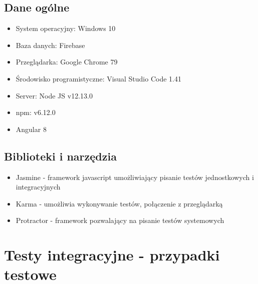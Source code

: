 \documentclass[a4paper,15pt]{article}
\begin{document}
\subsection{Dane ogólne}
\begin{itemize}
\item System operacyjny: Windows 10
\item Baza danych: Firebase
\item Przeglądarka: Google Chrome 79
\item Środowisko programistyczne: Visual Studio Code 1.41
\item Server: Node JS v12.13.0
\item npm: v6.12.0
\item Angular 8
\end{itemize}

\subsection{Biblioteki i narzędzia}
\begin{itemize}
\item Jasmine - framework javascript umożliwiający pisanie testów jednostkowych i integracyjnych
\item Karma - umożliwia wykonywanie testów, połączenie z przeglądarką
\item Protractor - framework pozwalający na pisanie testów systemowych
\end{itemize}

\newpage
\section{Testy integracyjne - przypadki testowe}
\end{document}
